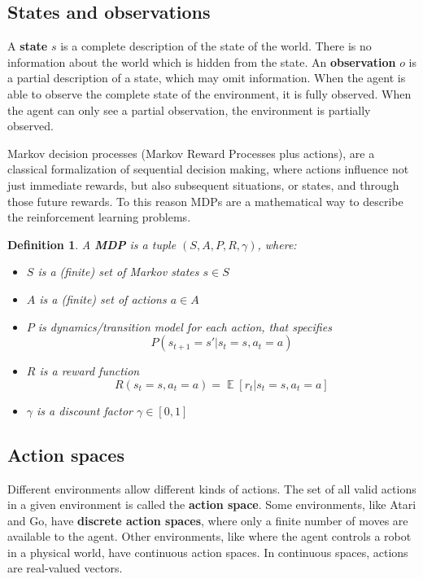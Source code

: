 \documentclass{article}
\newtheorem{definition}{Definition}
\DeclareMathOperator*{\E}{\mathbb{E}}
\begin{document}
\subsection{States and observations}
A \textbf{state} $s$ is a complete description of the state of the world. There is no information about the world which is hidden from the state. An \textbf{observation} $o$ is a partial description of a state, which may omit information. When the agent is able to observe the complete state of the environment, it is fully observed. When the agent can only see a partial observation, the environment is partially observed.

Markov decision processes (Markov Reward Processes plus actions), are a classical formalization of sequential decision making, where actions influence not just immediate rewards, but also subsequent situations, or states, and through those future rewards. To this reason MDPs are a mathematical way to describe the reinforcement learning problems. 

\begin{definition}
	A \textbf{MDP} is a tuple $(S,A, P, R, \gamma)$, where:
	\begin{itemize}
		\item $S$ is a (finite) set of Markov states $s \in S$
		\item $A$ is a (finite) set of actions $a \in A$
		\item $P$ is dynamics/transition model for each action, that specifies
		$$P(s_{t+1} =s'|s_t =s,a_t =a)$$
		\item $R$ is a reward function
		$$R(s_t =s,a_t =a)=\E[r_t|s_t =s,a_t =a]$$
		\item $\gamma$ is a discount factor $\gamma \in [0,1]$
	\end{itemize}
\end{definition}


\subsection{Action spaces}
Different environments allow different kinds of actions. The set of all valid actions in a given environment is called the \textbf{action space}. Some environments, like Atari and Go, have \textbf{discrete action spaces}, where only a finite number of moves are available to the agent. Other environments, like where the agent controls a robot in a physical world, have continuous action spaces. In continuous spaces, actions are real-valued vectors.
\end{document}
